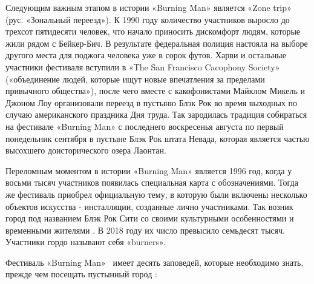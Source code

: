 \documentclass[10pt,a4paper]{report}
\begin{document}
Следующим важным этапом в истории «Burning Man» является
«Zone trip» (рус. «Зональный переезд»). К 1990 году
количество участников выросло до трехсот пятидесяти
человек, что начало приносить дискомфорт людям, которые
жили рядом с Бейкер-Бич. В результате федеральная полиция
настояла на выборе другого места для поджога человека уже
в сорок футов. Харви и остальные участники фестиваля
вступили в «The San Francisco Cacophony Society»
(«объединение людей, которые ищут новые впечатления за
пределами привычного общества»), после чего вместе с
какофонистами Майклом Микель и Джоном Лоу организовали
переезд в пустыню Блэк Рок во время выходных по случаю
американского праздника Дня труда. Так зародилась
традиция собираться на фестивале «Burning Man» с
последнего воскресенья августа по первый понедельник
сентября в пустыне Блэк Рок штата Невада, которая
является частью высохшего доисторического озера Лаонтан.

Переломным моментом в истории «Burning Man» является 1996 год,
когда у восьми тысяч участников появилась специальная карта с
обозначениями. Тогда же фестиваль приобрел официальную тему, в
которую были включены несколько объектов искусства - инсталляции,
созданные лично участниками. Так возник город под названием Блэк
Рок Сити со своими культурными особенностями и временными
жителями . В 2018 году их число превысило семьдесят тысяч.
Участники гордо называют себя «burners».

Фестиваль «Burning Man»~\cite{ньюман1998неопросные}
имеет десять заповедей, которые необходимо знать, прежде чем посещать пустынный
город :
\end{document}
